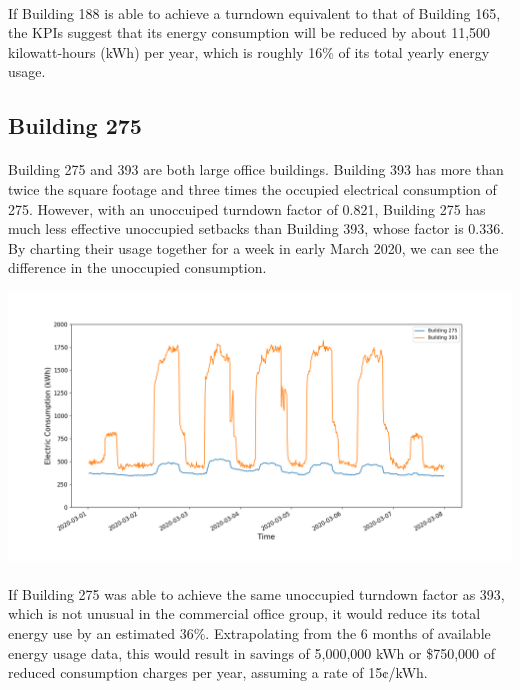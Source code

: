 \documentclass[a4paper]{article}
\begin{document}
\paragraph{}
If Building 188 is able to achieve a turndown equivalent to that of Building 165, the KPIs suggest that its energy consumption will be reduced by about 11,500 kilowatt-hours (kWh) per year, which is roughly 16\% of its total yearly energy usage.

\subsection{Building 275}

\paragraph{}
Building 275 and 393 are both large office buildings. Building 393 has more than twice the square footage and three times the occupied electrical consumption of 275. However, with an unoccuiped turndown factor of 0.821, Building 275 has much less effective unoccupied setbacks than Building 393, whose factor is 0.336. By charting their usage together for a week in early March 2020, we can see the difference in the unoccupied consumption.

\includegraphics[width=.9\columnwidth]{./images/275v393_Turndown.png}

\paragraph{}
If Building 275 was able to achieve the same unoccupied turndown factor as 393, which is not unusual in the commercial office group, it would reduce its total energy use by an estimated 36\%. Extrapolating from the 6 months of available energy usage data, this would result in savings of 5,000,000 kWh or \$750,000 of reduced consumption charges per year, assuming a rate of 15¢/kWh.
\end{document}
